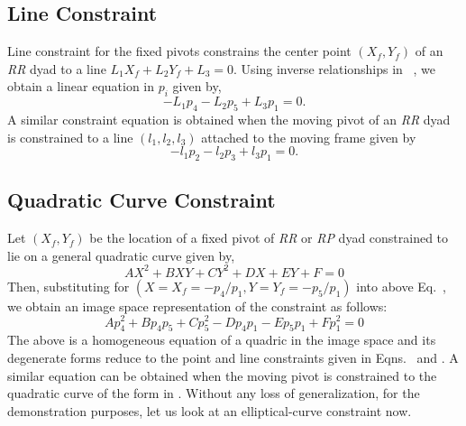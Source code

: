 \subsection{Line Constraint}
Line constraint for the fixed pivots constrains the center point $(X_f,Y_f)$ of an \emph{RR} dyad to a line $L_1X_f+L_2Y_f+L_3=0$. Using inverse relationships in ~, we obtain a linear equation in $p_i$ given by,
\begin{equation}\label{fixedLine}
-L_1p_4-L_2p_5+L_3p_1=0.
\end{equation}
A similar constraint equation is obtained when the moving pivot of an \emph{RR} dyad is constrained to a line $(l_1,l_2,l_3)$ attached to the moving frame given by
\begin{equation}\label{c3centerpointLine}
-l_1p_2-l_2p_3+l_3p_1=0.
\end{equation}

\subsection{Quadratic Curve Constraint}
Let $(X_f, Y_f)$ be the location of a fixed pivot of \emph{RR} or \emph{RP} dyad constrained to lie on a general quadratic curve given by,
\begin{equation}\label{quadCurve}
AX^2+BXY+CY^2+DX+EY+F=0
\end{equation}
Then, substituting for $(X = X_f = -p_4/p_1, Y= Y_f = -p_5/p_1)$ into above Eq.~, we obtain an image space representation of the constraint as follows:
\begin{equation}\label{piquadCurve}
Ap_4^2+Bp_4p_5+Cp_5^2-Dp_4p_1-Ep_5p_1+Fp_1^2=0
\end{equation}
The above is a homogeneous equation of a quadric in the image space and its degenerate forms reduce to the point and line constraints given in Eqns.~ and . A similar equation can be obtained when the moving pivot is constrained to the quadratic curve of the form in . Without any loss of generalization, for the demonstration purposes, let us look at an elliptical-curve constraint now.

